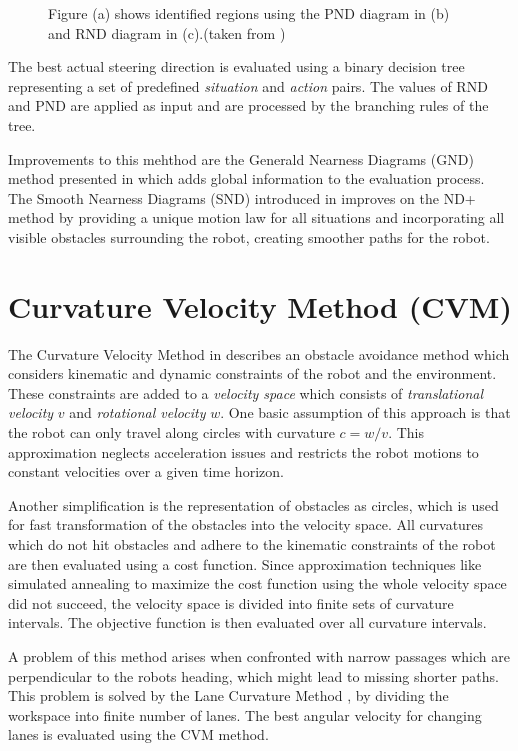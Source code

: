 \begin{figure}[thpb]
{       %
    }
   \caption[Nearness Diagram.]{Figure (a) shows identified regions using the PND diagram in (b) and RND diagram in (c).(taken from \cite{minguez2004nearness})}
   \label{fig:fig_nd}
\end{figure}

The best actual steering direction is evaluated using a binary decision tree representing a set of predefined \emph{situation} and \emph{action} pairs. 
The values of RND and PND are applied as input and are processed by the branching rules of the tree. 

Improvements to this mehthod are the Generald Nearness Diagrams (GND) method presented in \cite{minguez2001global} which adds global information to the evaluation process. 
The Smooth Nearness Diagrams (SND) introduced in \cite{durham2008smooth} improves on the ND+ method by providing a unique motion law for all situations and incorporating all visible obstacles surrounding the robot, creating smoother paths for the robot.
 
\section{Curvature Velocity Method (CVM)}
The Curvature Velocity Method in \cite{simmons1996curvature} describes an obstacle avoidance method which considers kinematic and dynamic constraints of the robot and the environment.
These constraints are added to a \emph{velocity space} which consists of \emph{translational velocity} $v$ and \emph{rotational velocity} $w$.
One basic assumption of this approach is that the robot can only travel along circles with curvature $c=w/v$. 
This approximation neglects acceleration issues and restricts the robot motions to constant velocities over a given time horizon. 
  
Another simplification is the representation of obstacles as circles, which is used for fast transformation of the obstacles into the velocity space.
All curvatures which do not hit obstacles and adhere to the kinematic constraints of the robot are then evaluated using a cost function.
Since approximation techniques like simulated annealing to maximize the cost function using the whole velocity space did not succeed, the velocity space is divided into finite sets of curvature intervals.
The objective function is then evaluated over all curvature intervals.

A problem of this method arises when confronted with narrow passages which are perpendicular to the robots heading, which might lead to missing shorter paths. 
This problem is solved by the Lane Curvature Method \cite{ko1998lane}, by
dividing the workspace into finite number of lanes. 
The best angular velocity for changing lanes is evaluated using the CVM method. 

